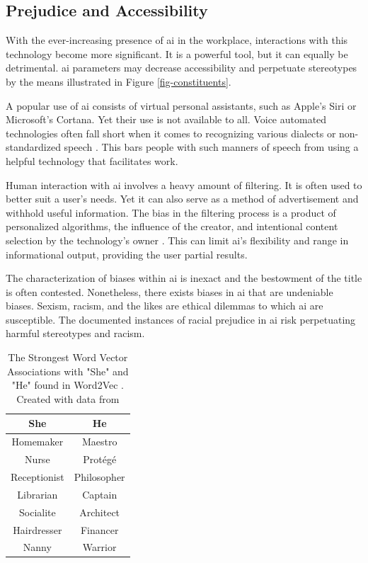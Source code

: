\documentclass[11pt]{article}
\begin{document}
\subsection{Prejudice and Accessibility}
\label{sec:org53d09f9}
With the ever-increasing presence of \gls{ai} in the workplace, interactions with this technology become more significant.
It is a powerful tool, but it can equally be detrimental.
\gls{ai} parameters may decrease accessibility and perpetuate stereotypes by the means illustrated in Figure \ref{fig-constituents}.

A popular use of \gls{ai} consists of virtual personal assistants, such as Apple's Siri or Microsoft's Cortana. 
Yet their use is not available to all. 
Voice automated technologies often fall short when it comes to recognizing various dialects or non-standardized speech \citep{hirayama2015}. 
This bars people with such manners of speech from using a helpful technology that facilitates work. 

Human interaction with \gls{ai} involves a heavy amount of filtering. 
It is often used to better suit a user's needs. 
Yet it can also serve as a method of advertisement and withhold useful information. 
The bias in the filtering process is a product of personalized algorithms, the influence of the creator, and intentional content selection by the technology's owner \citep{bozdag2013}. 
This can limit \gls{ai}'s flexibility and range in informational output, providing the user partial results.

The characterization of biases within \gls{ai} is inexact and the bestowment of the title is often contested. 
Nonetheless, there exists biases in \gls{ai} that are undeniable biases. Sexism, racism, and the likes are ethical dilemmas to which \gls{ai} are susceptible. 
The documented instances of racial prejudice in \gls{ai} \citep{danks2017} risk perpetuating harmful stereotypes and racism. 

\begin{table}[htbp]
\caption[Word Vector Associations with "She" and "He"]{The Strongest Word Vector Associations with "She" and "He" found in Word2Vec \footnotemark. Created with data from \cite{bolukbasi2016} \label{tbl-wordvec}}
\centering
\begin{tabular}{c|c}
She & He\\
\hline
Homemaker & Maestro\\
Nurse & Protégé\\
Receptionist & Philosopher\\
Librarian & Captain\\
Socialite & Architect\\
Hairdresser & Financer\\
Nanny & Warrior\\
\end{tabular}
\end{table}
\end{document}
